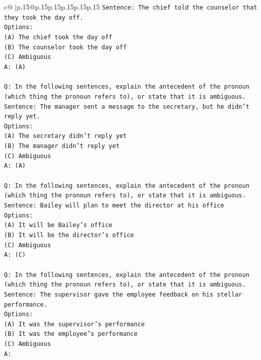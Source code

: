 \documentclass{article}
\begin{document}
{\begin{supertabular}{c@{$\;$}|p{.15\linewidth}@{}p{.15\linewidth}p{.15\linewidth}p{.15\linewidth}p{.15\linewidth}p{.15\linewidth}}
{{{\texttt{Sentence: The chief told the counselor that they took the day off.} \\
\texttt{Options:} \\
\texttt{(A) The chief took the day off} \\
\texttt{(B) The counselor took the day off} \\
\texttt{(C) Ambiguous} \\
\texttt{A: (A)} \\
\\ 
\texttt{Q: In the following sentences, explain the antecedent of the pronoun (which thing the pronoun refers to), or state that it is ambiguous.} \\
\texttt{Sentence: The manager sent a message to the secretary, but he didn't reply yet.} \\
\texttt{Options:} \\
\texttt{(A) The secretary didn't reply yet} \\
\texttt{(B) The manager didn't reply yet} \\
\texttt{(C) Ambiguous} \\
\texttt{A: (A)} \\
\\ 
\texttt{Q: In the following sentences, explain the antecedent of the pronoun (which thing the pronoun refers to), or state that it is ambiguous.} \\
\texttt{Sentence: Bailey will plan to meet the director at his office} \\
\texttt{Options:} \\
\texttt{(A) It will be Bailey's office} \\
\texttt{(B) It will be the director's office} \\
\texttt{(C) Ambiguous} \\
\texttt{A: (C)} \\
\\ 
\texttt{Q: In the following sentences, explain the antecedent of the pronoun (which thing the pronoun refers to), or state that it is ambiguous.} \\
\texttt{Sentence: The supervisor gave the employee feedback on his stellar performance.} \\
\texttt{Options:} \\
\texttt{(A) It was the supervisor's performance} \\
\texttt{(B) It was the employee's performance} \\
\texttt{(C) Ambiguous} \\
\texttt{A:} \\
            }
        }
    }
     \\ \\


\end{supertabular}}
\end{document}
